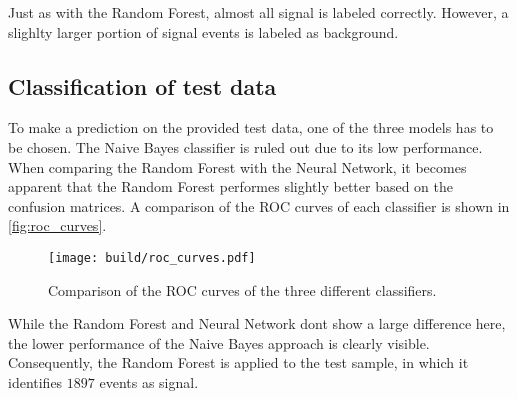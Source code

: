 Just as with the Random Forest, almost all signal is labeled correctly.
However, a slighlty larger portion of signal events is labeled as background.

\subsection{Classification of test data}

To make a prediction on the provided test data, one of the three models has
to be chosen. The Naive Bayes classifier is ruled out due to its low performance.
When comparing the Random Forest with the Neural Network, it becomes apparent that
the Random Forest performes slightly better based on the confusion matrices.
A comparison of the ROC curves of each classifier is shown in \autoref{fig:roc_curves}.

\begin{figure}[H]
  \centering
  \texttt{[image: build/roc\_curves.pdf]}
  \caption{Comparison of the ROC curves of the three different classifiers.}
  \label{fig:roc_curves}
\end{figure}

While the Random Forest and Neural Network dont show a large difference here, the
lower performance of the Naive Bayes approach is clearly visible.
Consequently, the Random Forest is applied to the test sample, in which it
identifies $1897$ events as signal.